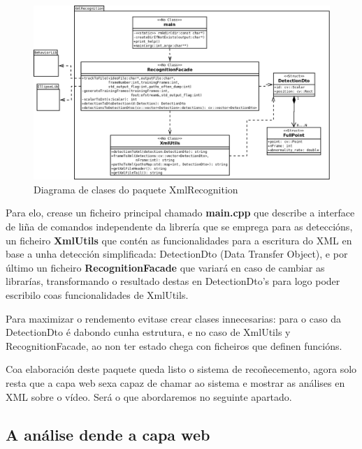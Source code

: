         \begin{figure}[htp]
        \begin{center}
            \includegraphics[scale=0.25]{figures/PaqXmlRecognition.png}
            \caption{Diagrama de clases do paquete XmlRecognition}
        \label{fig:PaqXmlRecognition}
        \end{center}
        \end{figure}
		
		Para elo, crease un ficheiro principal chamado \textbf{main.cpp} que describe a interface de liña de comandos
		independente da librería que se emprega para as deteccións, un ficheiro \textbf{XmlUtils} que contén as
		funcionalidades para a escritura do XML en base a unha detección simplificada: DetectionDto 
		(Data Transfer Object), e por último un ficheiro \textbf{RecognitionFacade} que variará en 
		caso de cambiar as librarías, transformando o resultado destas en DetectionDto's para logo
		poder escribilo coas funcionalidades de XmlUtils.
		
		Para maximizar o rendemento evitase crear clases innecesarias: para o caso da DetectionDto é dabondo
		cunha estrutura, e no caso de XmlUtils y RecognitionFacade, ao non ter estado chega con ficheiros
		que definen funcións.
		
		Coa elaboración deste paquete queda listo o sistema de recoñecemento, agora solo resta que a capa web
		sexa capaz de chamar ao sistema e mostrar as análises en XML sobre o vídeo. Será o que abordaremos
		no seguinte apartado.
		
	\subsection{A análise dende a capa web}
	

